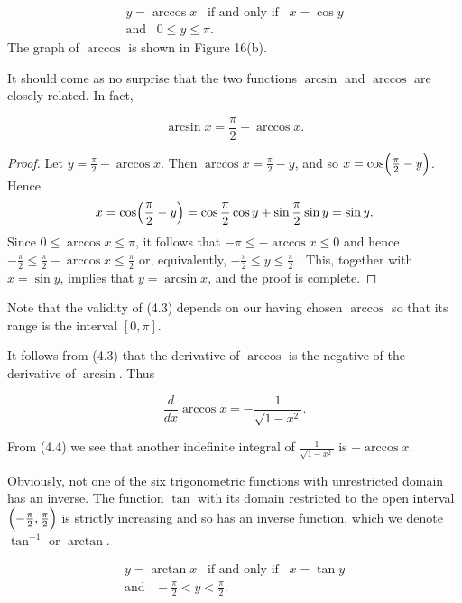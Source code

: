 $$
\begin{array}{c}
 y = \arccos x \;\;\; \mbox{if and only if}\;\;\;  x = \cos y  \\
 \mbox{and}\;\;\; 0 \leq y \leq \pi.
\end{array}
$$
The graph of $\arccos$ is shown in Figure 16(b).

It should come as no surprise that the two functions $\arcsin$ and $\arccos$ are closely related. In fact, 

\begin{theorem} %
$$
\arcsin x = \frac{\pi}{2} - \arccos x.
$$
\end{theorem}


\begin{proof}
Let $y = \frac{\pi}{2} - \arccos x$. Then $\arccos x = \frac{\pi}{2} - y$, and so 
$x = \cos \Bigl(\frac{\pi}{2} - y \Bigr)$.
Hence 
$$
x = \cos \Bigl(\frac{\pi}{2} - y \Bigr) = \cos \frac{\pi}{2} \cos y + \sin \frac{\pi}{2} \sin y = \sin y.
$$
Since $0 \leq \arccos x \leq \pi$, it follows that $-\pi \leq - \arccos x \leq 0$ and hence 
$- \frac{\pi}{2} \leq \frac{\pi}{2} -\arccos x \leq \frac{\pi}{2}$ or, equivalently, $- \frac{\pi}{2} \leq y \leq \frac{\pi}{2}$ . This, together with $x = \sin y$, implies that $y = \arcsin x$, and the proof is complete.
\end{proof}

Note that the validity of (4.3) depends on our having chosen $\arccos$ so that its range is the interval $[0, \pi]$.

It follows from (4.3) that the derivative of $\arccos$ is the negative of the derivative of $\arcsin$. Thus

\begin{theorem} %
$$
\frac{d}{dx} \arccos x = -\frac{1}{\sqrt{1 - x^2}}.
$$
\end{theorem}

From (4.4) we see that another indefinite integral of $\frac{1}{\sqrt{1 - x^2}}$ is $-\arccos x$.

Obviously, not one of the six trigonometric functions with unrestricted domain has an inverse.
The function $\tan$ with its domain restricted to the open interval $\Bigl( -\frac{\pi}{2}, \frac{\pi}{2} \Bigr)$ is strictly increasing and so has an inverse function, which we denote $\tan^{-1}$ or $\arctan$.

$$ 
\begin{array}{c}
y = \arctan x \;\;\; \mbox{if and only if} \;\;\; x = \tan y  \\
\mbox{and}\;\;\; -\frac{\pi}{2} < y < \frac{\pi}{2}.
\end{array}
$$

